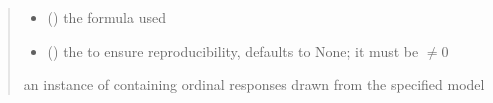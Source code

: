 \documentclass[letterpaper,10pt,english]{sphinxmanual}
\begin{document}
\begin{fulllineitems}
\begin{quote}
\begin{description}
\begin{itemize}
\item {} 
\sphinxAtStartPar
{} () \textendash{} the formula used

\item {} 
\sphinxAtStartPar
{} (\sphinxstyleliteralemphasis{\sphinxupquote{, }}) \textendash{} the  to ensure reproducibility, defaults to None;
it must be \(\neq 0\)

\end{itemize}

\sphinxAtStartPar
an instance of  containing ordinal responses drawn from the specified model

\end{description}\end{quote}

\end{fulllineitems}

\end{document}
